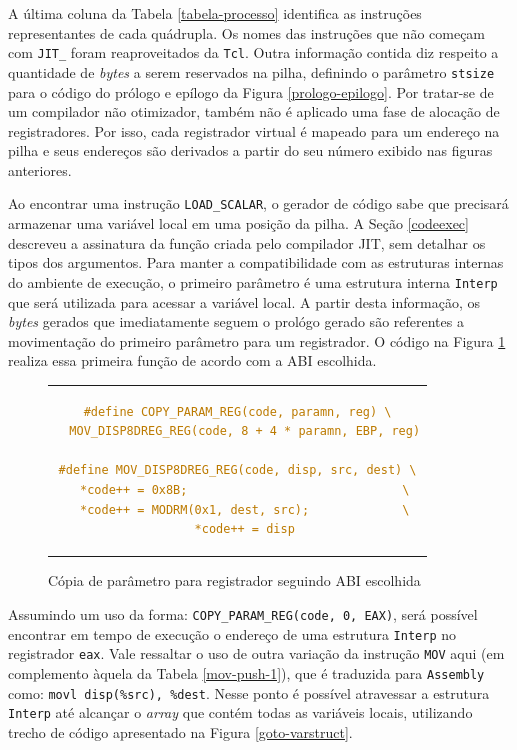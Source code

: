 A última coluna da Tabela \ref{tabela-processo} identifica as
instruções representantes de cada quádrupla.
Os nomes das instruções que não
começam com \verb!JIT_! foram reaproveitados da \texttt{Tcl}.
Outra informação contida
diz respeito a quantidade de \textit{bytes} a serem reservados na
pilha, definindo o parâmetro \verb!stsize! para o código do prólogo e
epílogo da Figura \ref{prologo-epilogo}. Por tratar-se de um compilador não
otimizador, também não é aplicado uma fase de alocação de
registradores. Por isso, cada registrador virtual é mapeado para um
endereço na pilha e seus endereços são derivados a partir do seu
número exibido nas figuras anteriores.

Ao encontrar uma instrução \verb!LOAD_SCALAR!, o gerador de código
sabe que precisará armazenar uma variável local em uma posição da
pilha. A Seção \ref{codeexec} descreveu a assinatura
da função criada pelo compilador JIT, sem detalhar os tipos dos argumentos.
Para manter a compatibilidade com as estruturas internas do ambiente de
execução, o primeiro parâmetro é uma estrutura
interna \verb!Interp! que será utilizada para acessar a
variável local. A partir desta informação, os \textit{bytes} gerados que
imediatamente seguem o prológo gerado são referentes a movimentação do
primeiro parâmetro para um registrador. O código na Figura
\ref{copy-param} realiza essa primeira função de acordo com a ABI escolhida.


\begin{figure}[ht!]
  \centering
  \begin{tabular}{c}
    \begin{lstlisting}[language=C]
#define COPY_PARAM_REG(code, paramn, reg) \
  MOV_DISP8DREG_REG(code, 8 + 4 * paramn, EBP, reg)

#define MOV_DISP8DREG_REG(code, disp, src, dest) \
  *code++ = 0x8B;                              \
  *code++ = MODRM(0x1, dest, src);             \
  *code++ = disp
    \end{lstlisting}
  \end{tabular}
  \caption{Cópia de parâmetro para registrador seguindo ABI escolhida\label{copy-param}}
\end{figure}

Assumindo um uso da forma:
\verb!COPY_PARAM_REG(code, 0, EAX)!, será possível encontrar em tempo de 
execução o endereço de uma estrutura \verb!Interp! no registrador 
\verb!eax!. Vale ressaltar o uso de outra variação
da instrução
\verb!MOV! aqui (em complemento àquela da Tabela \ref{mov-push-1}),
 que é traduzida para \texttt{Assembly} como:
\verb!movl disp(%src), %dest!. Nesse ponto é possível atravessar a
estrutura \verb!Interp! até
alcançar o \textit{array} que contém todas as variáveis locais, utilizando
trecho de código apresentado na Figura \ref{goto-varstruct}.

